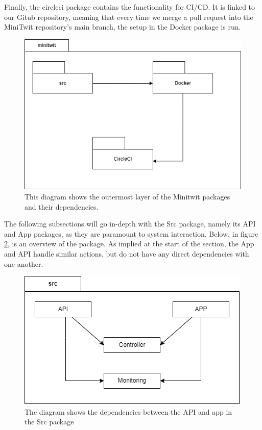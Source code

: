 Finally, the circleci package contains the functionality for CI/CD. It is linked to our Gitub repository, meaning that every time we merge a pull request into the MiniTwit repository's main branch, the setup in the Docker package is run. 

\begin{figure}[H]
    \centering
    \includegraphics[scale=0.60]{images/packages.png}
    \caption{This diagram shows the outermost layer of the Minitwit packages and their dependencies.}
    \label{fig:packages}
\end{figure}

The following subsections will go in-depth with the Src package, namely its API and App packages, as they are paramount to system interaction. Below, in figure \ref{fig:src}, is an overview of the package. As implied at the start of the section, the App and API handle similar actions, but do not have any direct dependencies with one another. 


\begin{figure}[H]
    \centering
    \includegraphics[scale=0.75]{images/src.png}
    \caption{The diagram shows the dependencies between the API and app in the Src package}
    \label{fig:src}
\end{figure}

